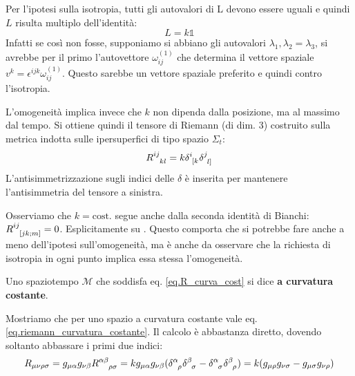 Per l'ipotesi sulla isotropia, tutti gli autovalori di L devono essere uguali e quindi $L$ risulta multiplo dell'identità:
\begin{equation*}
    L = k \mathds{1}
\end{equation*}
Infatti se così non fosse, supponiamo si abbiano gli autovalori $\lambda_1, \lambda_2 = \lambda_3$, si avrebbe per il primo l'autovettore $\omega^{(1)}_{ij}$ che determina il vettore spaziale $v^k = \epsilon^{ijk}\omega^{(1)}_{ij}$. Questo sarebbe un vettore spaziale preferito e quindi contro l'isotropia.

L'omogeneità implica invece che $k$ non dipenda dalla posizione, ma al massimo dal tempo. Si ottiene quindi il tensore di Riemann (di dim. 3) costruito sulla metrica indotta sulle ipersuperfici di tipo spazio $\Sigma_t$:
\begin{equation}
    \tensor{R}{^{ij}_{kl}} = k \tensor{\delta}{^i_{[k}} \tensor{\delta}{^j_{l]}}
    \label{eq.R_curva_cost}
\end{equation}
L'antisimmetrizzazione sugli indici delle $\delta$ è inserita per mantenere l'antisimmetria del tensore a sinistra.

Osserviamo che $k= \textrm{cost.}$ segue anche dalla seconda identità di Bianchi: $\tensor{R}{^{ij}_{[jk;m]}}=0$. Esplicitamente su \cite{wald}. Questo comporta che si potrebbe fare anche a meno dell'ipotesi sull'omogeneità, ma è anche da osservare che la richiesta di isotropia in ogni punto implica essa stessa l'omogeneità.

\begin{definizione}
Uno  spaziotempo $\mathcal{M}$ che soddisfa eq. \ref{eq.R_curva_cost} si dice \textbf{a curvatura costante}.
\end{definizione}

Mostriamo che per uno spazio a curvatura costante vale eq. \ref{eq.riemann_curvatura_costante}. Il calcolo è abbastanza diretto, dovendo soltanto abbassare i primi due indici:
\begin{equation*}
    R_{\mu\nu\rho\sigma} = g_{\mu\alpha}g_{\nu\beta} \tensor{R}{^{\alpha\beta}_{\rho\sigma}} = kg_{\mu\alpha}g_{\nu\beta}(\tensor{\delta}{^\alpha_\rho}\tensor{\delta}{^\beta_\sigma} - \tensor{\delta}{^\alpha_\sigma}\tensor{\delta}{^\beta_\rho}) = k(g_{\mu\rho}g_{\nu\sigma} - g_{\mu\sigma}g_{\nu\rho})
\end{equation*}

